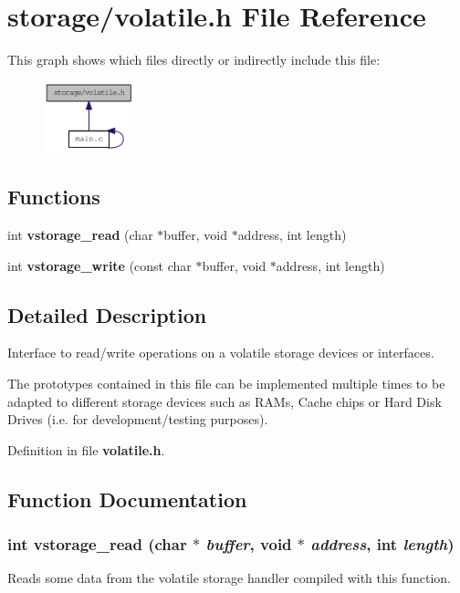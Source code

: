 \section{storage/volatile.h File Reference}
\label{d2/dc4/volatile_8h}
This graph shows which files directly or indirectly include this file:\nopagebreak
\begin{figure}[H]
\begin{center}
\leavevmode
\includegraphics[width=74pt]{de/d35/volatile_8h__dep__incl}
\end{center}
\end{figure}
\subsection*{Functions}
\begin{DoxyCompactItemize}
\item 
int {\bf vstorage\_\-read} (char $\ast$buffer, void $\ast$address, int length)
\item 
int {\bf vstorage\_\-write} (const char $\ast$buffer, void $\ast$address, int length)
\end{DoxyCompactItemize}


\subsection{Detailed Description}
Interface to read/write operations on a volatile storage devices or interfaces.

The prototypes contained in this file can be implemented multiple times to be adapted to different storage devices such as RAMs, Cache chips or Hard Disk Drives (i.e. for development/testing purposes). 

Definition in file {\bf volatile.h}.



\subsection{Function Documentation}
\subsubsection[{vstorage\_\-read}]{\setlength{\rightskip}{0pt plus 5cm}int vstorage\_\-read (char $\ast$ {\em buffer}, \/  void $\ast$ {\em address}, \/  int {\em length})}\label{d2/dc4/volatile_8h_a0a12c5736c6deb1289081f8c102ca28e}
Reads some data from the volatile storage handler compiled with this function.

